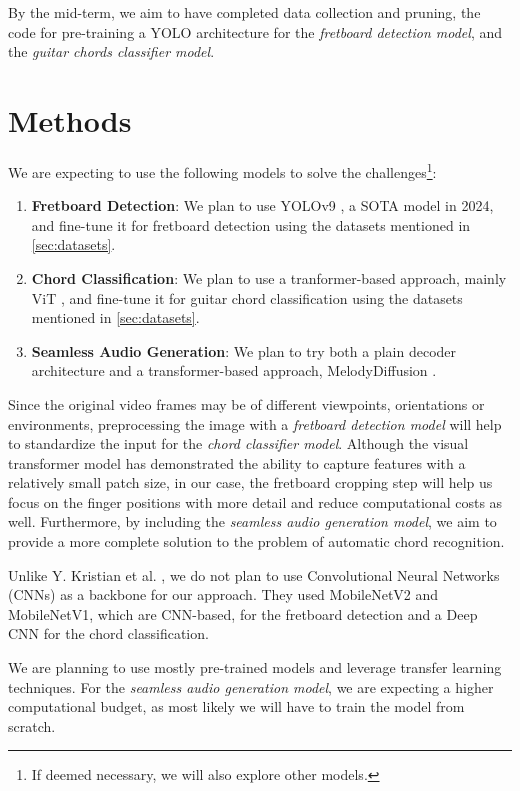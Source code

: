 \documentclass[10pt,twocolumn,letterpaper]{article}
\begin{document}
By the mid-term, we aim to have completed data collection and pruning, the code for pre-training a YOLO architecture for the \emph{fretboard detection model}, and the \emph{guitar chords classifier model}.

\section{Methods}\label{sec:methods}

We are expecting to use the following models to solve the challenges\footnote{If deemed necessary, we will also explore other models.}:
\begin{enumerate}[label=\arabic*), itemsep=0.25pt]
    \item \textbf{Fretboard Detection}: We plan to use YOLOv9 \cite{wang2024yolov9}, a SOTA model in 2024, and fine-tune it for fretboard detection using the datasets mentioned in \cref{sec:datasets}.
    \item \textbf{Chord Classification}: We plan to use a tranformer-based approach, mainly ViT \cite{dosovitskiy2020image}, and fine-tune it for guitar chord classification using the datasets mentioned in \cref{sec:datasets}.
    \item \textbf{Seamless Audio Generation}: We plan to try both a plain decoder architecture and a transformer-based approach, MelodyDiffusion \cite{math11081915}.
\end{enumerate}

Since the original video frames may be of different viewpoints, orientations or environments, preprocessing the image with a \emph{fretboard detection model} will help to standardize the input for the \emph{chord classifier model}. Although the visual transformer model has demonstrated the ability to capture features with a relatively small patch size, in our case, the fretboard cropping step will help us focus on the finger positions with more detail and reduce computational costs as well.
Furthermore, by including the \emph{seamless audio generation model}, we aim to provide a more complete solution to the problem of automatic chord recognition.

Unlike Y. Kristian et al. \cite{Kristian_Zaman_Tenoyo_Jodhinata_2024}, we do not plan to use Convolutional Neural Networks (CNNs) as a backbone for our approach. They used MobileNetV2 and MobileNetV1, which are CNN-based, for the fretboard detection and a Deep CNN for the chord classification. 

We are planning to use mostly pre-trained models and leverage transfer learning techniques. For the \emph{seamless audio generation model}, we are expecting a higher computational budget, as most likely we will have to train the model from scratch.
\end{document}
